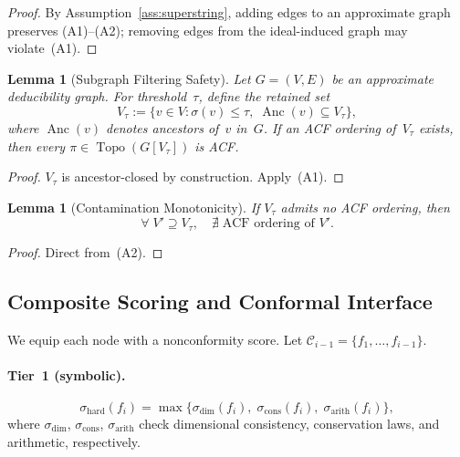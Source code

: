 \documentclass{uai2026} %
\theoremstyle{remark}
\theoremstyle{plain}
\newtheorem{lemma}[theorem]{Lemma}
\theoremstyle{definition}
\begin{document}
\begin{proof}
By Assumption~\ref{ass:superstring}, adding edges
to an approximate graph preserves (A1)--(A2); removing
edges from the ideal-induced graph may violate~(A1).
\end{proof}

\begin{lemma}[Subgraph Filtering Safety]
\label{lem:subgraph-safety}
Let $G=(V,E)$ be an approximate deducibility graph.
For threshold~$\tau$, define the retained set
\begin{equation}\label{eq:retained}
  V_{\tau}:=\bigl\{v\!\in\!V:
  \sigma(v)\le\tau,\;
  \operatorname{Anc}(v)\!\subseteq\!V_{\tau}
  \bigr\},
\end{equation}
where $\operatorname{Anc}(v)$ denotes ancestors of~$v$
in~$G$.  If an ACF ordering of~$V_{\tau}$ exists, then
every $\pi\in\operatorname{Topo}(G[V_{\tau}])$ is ACF.
\end{lemma}

\begin{proof}
$V_{\tau}$ is ancestor-closed by construction.
Apply~(A1).
\end{proof}

\begin{lemma}[Contamination Monotonicity]
\label{lem:contamination}
If $V_{\tau}$ admits no ACF ordering, then
\begin{equation}\label{eq:contam}
  \forall\;V'\supseteq V_{\tau},\quad
  \nexists\;\text{ACF ordering of }V'.
\end{equation}
\end{lemma}

\begin{proof}
Direct from~(A2).
\end{proof}

\subsection{Composite Scoring and Conformal Interface}

We equip each node with a nonconformity score.
Let $\mathcal{C}_{i-1}=\{f_{1},\dots,f_{i-1}\}$.

\paragraph{Tier~1 (symbolic).}
\begin{equation}\label{eq:hard}
  \sigma_{\mathrm{hard}}(f_{i})
  = \max\!\bigl\{
    \sigma_{\mathrm{dim}}(f_{i}),\;
    \sigma_{\mathrm{cons}}(f_{i}),\;
    \sigma_{\mathrm{arith}}(f_{i})
  \bigr\},
\end{equation}
where $\sigma_{\mathrm{dim}}$, $\sigma_{\mathrm{cons}}$,
$\sigma_{\mathrm{arith}}$ check dimensional consistency,
conservation laws, and arithmetic, respectively.
\end{document}
